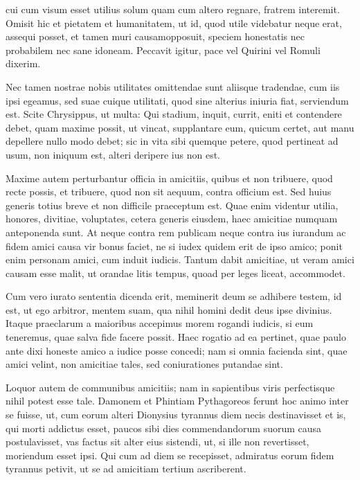  cui cum visum esset utilius solum quam cum altero regnare, fratrem interemit. Omisit hic et pietatem et humanitatem, ut id, quod utile videbatur neque erat, assequi posset, et tamen muri causamopposuit, speciem honestatis nec probabilem nec sane idoneam. Peccavit igitur, pace vel Quirini vel Romuli dixerim.

 Nec tamen nostrae nobis utilitates omittendae sunt aliisque tradendae, cum iis ipsi egeamus, sed suae cuique utilitati, quod sine alterius iniuria fiat, serviendum est. Scite Chrysippus, ut multa: Qui stadium, inquit, currit, eniti et contendere debet, quam maxime possit, ut vincat, supplantare eum, quicum certet, aut manu depellere nullo modo debet; sic in vita sibi quemque petere, quod pertineat ad usum, non iniquum est, alteri deripere ius non est.

 Maxime autem perturbantur officia in amicitiis, quibus et non tribuere, quod recte possis, et tribuere, quod non sit aequum, contra officium est. Sed huius generis totius breve et non difficile praeceptum est. Quae enim videntur utilia, honores, divitiae, voluptates, cetera generis eiusdem, haec amicitiae numquam anteponenda sunt. At neque contra rem publicam neque contra ius iurandum ac fidem amici causa vir bonus faciet, ne si iudex quidem erit de ipso amico; ponit enim personam amici, cum induit iudicis. Tantum dabit amicitiae, ut veram amici causam esse malit, ut orandae litis tempus, quoad per leges liceat, accommodet.

 Cum vero iurato sententia dicenda erit, meminerit deum se adhibere testem, id est, ut ego arbitror, mentem suam, qua nihil homini dedit deus ipse divinius. Itaque praeclarum a maioribus accepimus morem rogandi iudicis, si eum teneremus, quae salva fide facere possit. Haec rogatio ad ea pertinet, quae paulo ante dixi honeste amico a iudice posse concedi; nam si omnia facienda sint, quae amici velint, non amicitiae tales, sed coniurationes putandae sint.

 Loquor autem de communibus amicitiis; nam in sapientibus viris perfectisque nihil potest esse tale. Damonem et Phintiam Pythagoreos ferunt hoc animo inter se fuisse, ut, cum eorum alteri Dionysius tyrannus diem necis destinavisset et is, qui morti addictus esset, paucos sibi dies commendandorum suorum causa postulavisset, vas factus sit alter eius sistendi, ut, si ille non revertisset, moriendum esset ipsi. Qui cum ad diem se recepisset, admiratus eorum fidem tyrannus petivit, ut se ad amicitiam tertium ascriberent.

